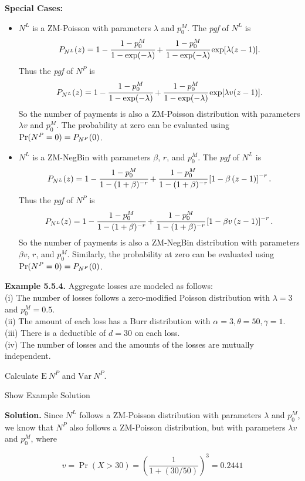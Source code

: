\documentclass[]{book}
\theoremstyle{definition}
\theoremstyle{definition}
\theoremstyle{definition}
\theoremstyle{remark}
\begin{document}
\textbf{Special Cases:}

\begin{itemize}
\item
  \(N^{L}\) is a ZM-Poisson with parameters \(\lambda\) and \(p_0^{M}\).
  The \emph{pgf} of \(N^L\) is
  \[P_{N^{L}}(z)=1-\cfrac{1-p_0^{M}}{1-\exp(-\lambda)}+\cfrac{1-p_0^{M}}{1-\exp(-\lambda)}\exp[\lambda(z-1)].\]
  Thus the \emph{pgf} of \(N^P\) is
  \[P_{N^{L}}(z)=1-\cfrac{1-p_0^{M}}{1-\exp(-\lambda)}+\cfrac{1-p_0^{M}}{1-\exp(-\lambda)}\exp[\lambda v(z-1)].\]
  So the number of payments is also a ZM-Poisson distribution with
  parameters \(\lambda v\) and \(p_0^{M}\). The probability at zero can
  be evaluated using \({\rm Pr}(N^P=0) = P_{N^P}(0)\).
\item
  \(N^{L}\) is a ZM-NegBin with parameters \(\beta\), \(r\), and
  \(p_0^{M}\). The \emph{pgf} of \(N^L\) is
  \[P_{N^{L}}(z)=1-\cfrac{1-p_0^{M}}{1-(1+\beta)^{-r}}+\cfrac{1-p_0^{M}}{1-(1+\beta)^{-r}}\left[ 1-\beta \left( z-1\right)\right]^{-r}.\]
  Thus the \emph{pgf} of \(N^P\) is
  \[P_{N^{L}}(z)=1-\cfrac{1-p_0^{M}}{1-(1+\beta)^{-r}}+\cfrac{1-p_0^{M}}{1-(1+\beta)^{-r}}\left[ 1-\beta v\left( z-1\right)\right]^{-r}.\]
  So the number of payments is also a ZM-NegBin distribution with
  parameters \(\beta v\), \(r\), and \(p_0^{M}\). Similarly, the
  probability at zero can be evaluated using
  \({\rm Pr}(N^P=0) = P_{N^P}(0)\).
\end{itemize}

\textbf{Example 5.5.4.} Aggregate losses are modeled as follows:\\
(i) The number of losses follows a zero-modified Poisson distribution
with \(\lambda=3\) and \(p_0^M = 0.5\).\\
(ii) The amount of each loss has a Burr distribution with
\(\alpha=3, \theta=50, \gamma=1\).\\
(iii) There is a deductible of \(d=30\) on each loss.\\
(iv) The number of losses and the amounts of the losses are mutually
independent.

Calculate \(\mathrm{E~} N^P\) and \(\mathrm{Var~} N^P\).

Show Example Solution

\hypertarget{toggleExampleAggLoss.5.4}{}
\textbf{Solution.} Since \(N^L\) follows a ZM-Poisson distribution with
parameters \(\lambda\) and \(p_0^M\), we know that \(N^P\) also follows
a ZM-Poisson distribution, but with parameters \(\lambda v\) and
\(p_0^M\), where

\[v = \Pr(X>30) = \left( \frac{1}{1+(30/50)} \right)^3 = 0.2441\]
\end{document}
